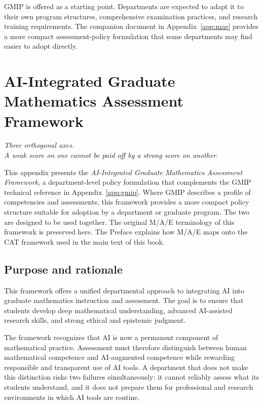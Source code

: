 \documentclass{SIAMbook2023}
\newcommand{\bookepigraph}[1]{%
  \begin{center}%
    \begin{minipage}{0.78\textwidth}%
      \centering\itshape #1%
    \end{minipage}%
  \end{center}%
  \vspace{0.6em}%
}
\begin{document}
GMIP is offered as a starting point. Departments are expected to adapt it to their own program structures, comprehensive examination practices, and research training requirements. The companion document in Appendix~\ref{app:mae} provides a more compact assessment-policy formulation that some departments may find easier to adopt directly.

\newpage


\chapter{AI-Integrated Graduate Mathematics Assessment Framework}
\label{app:ch:ai-integrated-graduate-mathematics-assessment-framework}%
\label{app:mae}

\bookepigraph{Three orthogonal axes.\\A weak score on one cannot be paid off by a strong score on another.}

This appendix presents the \emph{AI-Integrated Graduate Mathematics Assessment Framework}, a department-level policy formulation that complements the GMIP technical reference in Appendix~\ref{app:gmip}. Where GMIP describes a profile of competencies and assessments, this framework provides a more compact policy structure suitable for adoption by a department or graduate program. The two are designed to be used together. The original M/A/E terminology of this framework is preserved here. The Preface explains how M/A/E maps onto the CAT framework used in the main text of this book.

\section{Purpose and rationale}

This framework offers a unified departmental approach to integrating AI into graduate mathematics instruction and assessment. The goal is to ensure that students develop deep mathematical understanding, advanced AI-assisted research skills, and strong ethical and epistemic judgment.

The framework recognizes that AI is now a permanent component of mathematical practice. Assessment must therefore distinguish between human mathematical competence and AI-augmented competence while rewarding responsible and transparent use of AI tools. A department that does not make this distinction risks two failures simultaneously: it cannot reliably assess what its students understand, and it does not prepare them for professional and research environments in which AI tools are routine.
\end{document}
